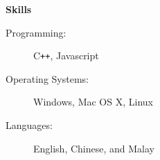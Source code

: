 \documentclass[letterpaper,11pt]{article}
\makeatletter
\newcommand{\resitem}[1]{\item #1 \vspace{-2pt}}
\newcommand{\resheading}[1]{{\begin{mdframed}[backgroundcolor=mygray]{\large \textbf{#1}}\end{mdframed}}}
\newcommand{\restitle}[2]{
\begin{tabular*}{7.1in}{l@{\extracolsep{\fill}}r}
		\textbf{#1} & #2 \\
\end{tabular*}}
\makeatother
\begin{document}



\resheading{Skills}

\begin{description}
\item[Programming:]
C\texttt{++}, Javascript
\item[Operating Systems:]
Windows, Mac OS X, Linux
\item[Languages:]
English, Chinese, and Malay
\end{description}
\end{document}
